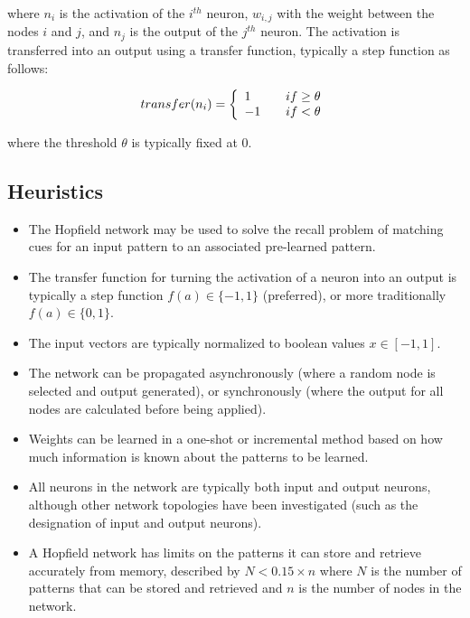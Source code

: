 where $n_i$ is the activation of the $i^{th}$ neuron, $w_{i,j}$ with the weight between the nodes $i$ and $j$, and $n_j$ is the output of the $j^{th}$ neuron. The activation is transferred into an output using a transfer function, typically a step function as follows:

	\[
	  transfer(n_i) = \left\{ 
	  \begin{array}{l l}
	    1 & \quad if \geq \theta\\
	    -1 & \quad if < \theta\\
	  \end{array} \right.
	\]

where the threshold $\theta$ is typically fixed at 0.

\subsection{Heuristics}
\begin{itemize}
	\item The Hopfield network may be used to solve the recall problem of matching cues for an input pattern to an associated pre-learned pattern.
	\item The transfer function for turning the activation of a neuron into an output is typically a step function $f(a) \in \{-1,1\}$ (preferred), or more traditionally $f(a) \in \{0,1\}$.
	\item The input vectors are typically normalized to boolean values $x \in [-1,1]$.
	\item The network can be propagated asynchronously (where a random node is selected and output generated), or synchronously (where the output for all nodes are calculated before being applied).
	\item Weights can be learned in a one-shot or incremental method based on how much information is known about the patterns to be learned.
	\item All neurons in the network are typically both input and output neurons, although other network topologies have been investigated (such as the designation of input and output neurons).
	\item A Hopfield network has limits on the patterns it can store and retrieve accurately from memory, described by $N<0.15\times n$ where $N$ is the number of patterns that can be stored and retrieved and $n$ is the number of nodes in the network.
\end{itemize}

